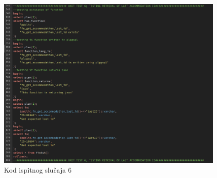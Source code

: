 				\begin{figure}[H]
					\centering
					\includegraphics[width=\textwidth]{slike/unit_tests/ut_6/code.png}
					\caption{Kod ispitnog slučaja 6}
					\label{fig: IS6-kod}
				\end{figure}
				\eject
			\eject
			
